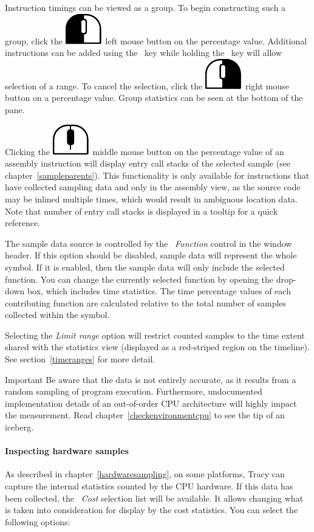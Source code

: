 \documentclass[hidelinks,titlepage,a4paper]{article}
\newcommand{\LMB}{\includegraphics[height=.8\baselineskip]{icons/lmb}}
\newcommand{\RMB}{\includegraphics[height=.8\baselineskip]{icons/rmb}}
\newcommand{\MMB}{\includegraphics[height=.8\baselineskip]{icons/mmb}}
\begin{document}
Instruction timings can be viewed as a group. To begin constructing such a group, click the \LMB{}~left mouse button on the percentage value. Additional instructions can be added using the \keys{\ctrl}~key while holding the \keys{\shift}~key will allow selection of a range. To cancel the selection, click the \RMB{}~right mouse button on a percentage value. Group statistics can be seen at the bottom of the pane.

Clicking the \MMB{}~middle mouse button on the percentage value of an assembly instruction will display entry call stacks of the selected sample (see chapter~\ref{sampleparents}). This functionality is only available for instructions that have collected sampling data and only in the assembly view, as the source code may be inlined multiple times, which would result in ambiguous location data. Note that number of entry call stacks is displayed in a tooltip for a quick reference.

The sample data source is controlled by the \emph{\faSitemap{}~Function} control in the window header. If this option should be disabled, sample data will represent the whole symbol. If it is enabled, then the sample data will only include the selected function. You can change the currently selected function by opening the drop-down box, which includes time statistics. The time percentage values of each contributing function are calculated relative to the total number of samples collected within the symbol.

Selecting the \emph{Limit range} option will restrict counted samples to the time extent shared with the statistics view (displayed as a red-striped region on the timeline). See section~\ref{timeranges} for more detail.

\begin{bclogo}[
noborder=true,
couleur=black!5,
logo=\bcbombe
]{Important}
Be aware that the data is not entirely accurate, as it results from a random sampling of program execution. Furthermore, undocumented implementation details of an out-of-order CPU architecture will highly impact the measurement. Read chapter~\ref{checkenvironmentcpu} to see the tip of an iceberg.
\end{bclogo}

\paragraph{Inspecting hardware samples}

As described in chapter~\ref{hardwaresampling}, on some platforms, Tracy can capture the internal statistics counted by the CPU hardware. If this data has been collected, the \emph{\faHighlighter{}~Cost} selection list will be available. It allows changing what is taken into consideration for display by the cost statistics. You can select the following options:
\end{document}
